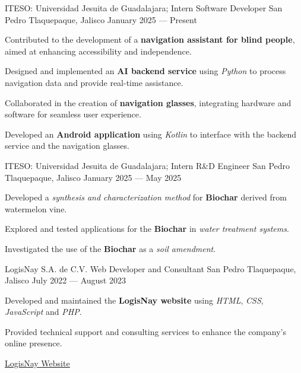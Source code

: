 \begin{cventries}

  \cventry
  {ITESO\@: Universidad Jesuita de Guadalajara; Intern}
  {Software Developer}
  {San Pedro Tlaquepaque, Jalisco}
  {January 2025 --- Present}
  {
    \begin{cvitems}
      \item {Contributed to the development of a \textbf{navigation assistant for blind people}, aimed at enhancing accessibility and independence.}
      \item {Designed and implemented an \textbf{AI backend service} using \textit{Python} to process navigation data and provide real-time assistance.}
      \item {Collaborated in the creation of \textbf{navigation glasses}, integrating hardware and software for seamless user experience.}
      \item {Developed an \textbf{Android application} using \textit{Kotlin} to interface with the backend service and the navigation glasses.}
    \end{cvitems}
  }

  \cventry
  {ITESO\@: Universidad Jesuita de Guadalajara; Intern}
  {R\&D Engineer}
  {San Pedro Tlaquepaque, Jalisco}
  {January 2025 --- May 2025}
  {
    \begin{cvitems}
      \item {Developed a \textit{synthesis and characterization method} for \textbf{Biochar} derived from watermelon vine.}
      \item {Explored and tested applications for the \textbf{Biochar} in \textit{water treatment systems}.}
      \item {Investigated the use of the \textbf{Biochar} as a \textit{soil amendment}.}
    \end{cvitems}
  }

  \cventry
  {LogisNay S.A. de C.V.}
  {Web Developer and Consultant}
  {San Pedro Tlaquepaque, Jalisco}
  {July 2022 --- August 2023}
  {
    \begin{cvitems}
      \item {Developed and maintained the \textbf{LogisNay website} using \textit{HTML}, \textit{CSS}, \textit{JavaScript} and \textit{PHP}.}
      \item {Provided technical support and consulting services to enhance the company's online presence.}
    \end{cvitems}
    \vspace{2.5em}
    \begin{cvitemsNoBullet}
      \item{
                  \underline{\href{https://logisnay.com}{LogisNay Website \faExternalLink}}
            }
    \end{cvitemsNoBullet}
  }

\end{cventries}